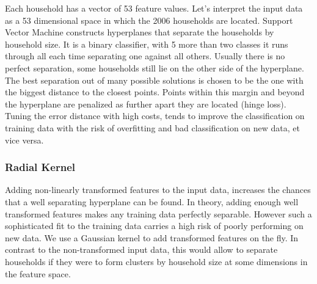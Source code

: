 \documentclass[]{article}
\newenvironment{Shaded}{\begin{snugshade}}{\end{snugshade}}
\newcommand{\DataTypeTok}[1]{\textcolor[rgb]{0.13,0.29,0.53}{#1}}
\newcommand{\DecValTok}[1]{\textcolor[rgb]{0.00,0.00,0.81}{#1}}
\newcommand{\FloatTok}[1]{\textcolor[rgb]{0.00,0.00,0.81}{#1}}
\newcommand{\KeywordTok}[1]{\textcolor[rgb]{0.13,0.29,0.53}{\textbf{#1}}}
\newcommand{\NormalTok}[1]{#1}
\newcommand{\OperatorTok}[1]{\textcolor[rgb]{0.81,0.36,0.00}{\textbf{#1}}}
\newcommand{\StringTok}[1]{\textcolor[rgb]{0.31,0.60,0.02}{#1}}
\begin{document}
Each household has a vector of 53 feature values. Let's interpret the
input data as a 53 dimensional space in which the 2006 households are
located. Support Vector Machine constructs hyperplanes that separate the
households by household size. It is a binary classifier, with 5 more
than two classes it runs through all each time separating one against
all others. Usually there is no perfect separation, some households
still lie on the other side of the hyperplane. The best separation out
of many possible solutions is chosen to be the one with the biggest
distance to the closest points. Points within this margin and beyond the
hyperplane are penalized as further apart they are located (hinge loss).
Tuning the error distance with high costs, tends to improve the
classification on training data with the risk of overfitting and bad
classification on new data, et vice versa.

\begin{Shaded}
\end{Shaded}

\hypertarget{radial-kernel}{%
\subsubsection{Radial Kernel}\label{radial-kernel}}

Adding non-linearly transformed features to the input data, increases
the chances that a well separating hyperplane can be found. In theory,
adding enough well transformed features makes any training data
perfectly separable. However such a sophisticated fit to the training
data carries a high risk of poorly performing on new data. We use a
Gaussian kernel to add transformed features on the fly. In contrast to
the non-transformed input data, this would allow to separate households
if they were to form clusters by household size at some dimensions in
the feature space.

\begin{Shaded}
\end{Shaded}
\end{document}
